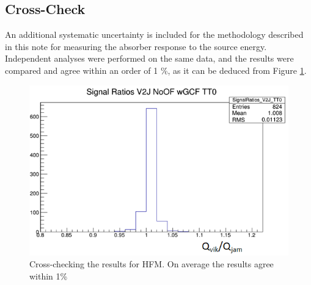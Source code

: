 \subsection{Cross-Check}
An additional systematic uncertainty is included for the
methodology described in this note for measuring the absorber response to the source energy. Independent analyses were performed on the same data, and the results were compared and agree within an order of 1 \%, as it can be deduced from Figure \ref{fig:Crosscheck}.
\begin{figure}[htb]
    \begin{center}
        \includegraphics[width=.5\textwidth]{figures/ch_hfcalibration/Crosscheck.png}
        \caption{Cross-checking the results for HFM. On average the results agree
        within 1\%}
        \label{fig:Crosscheck}
    \end{center}
\end{figure}
